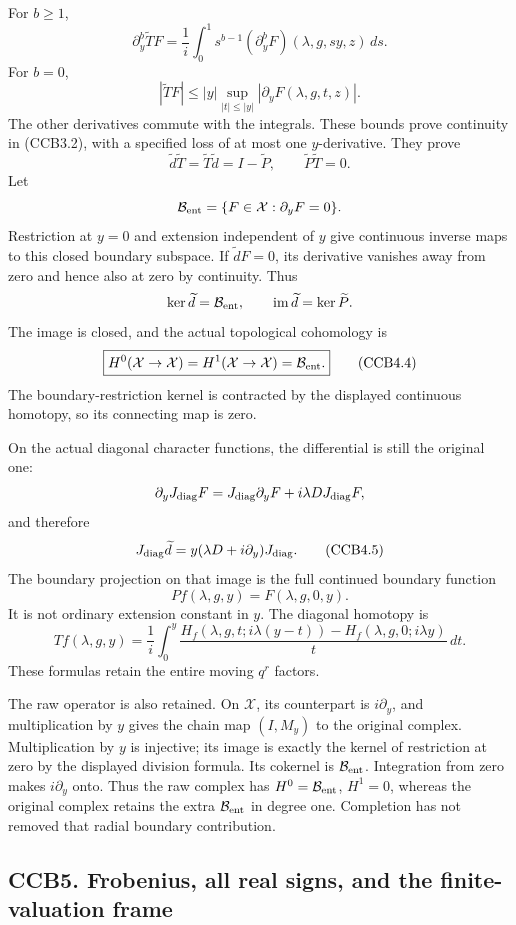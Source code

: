 For \(b\ge1\), \[
\partial_y^b\widetilde TF
=\frac1i\int_0^1s^{b-1}
(\partial_y^bF)(\lambda,g,sy,z)\,ds.
\tag{CCB4.2}
\] For \(b=0\), \[
|\widetilde TF|\le |y|
\sup_{|t|\le|y|}|\partial_yF(\lambda,g,t,z)|.
\] The other derivatives commute with the integrals. These bounds prove
continuity in (CCB3.2), with a specified loss of at most one
\(y\)-derivative. They prove \[
\widetilde d\widetilde T
=\widetilde T\widetilde d=I-\widetilde P,\qquad
\widetilde P\widetilde T=0.
\tag{CCB4.3}
\] Let \[
\mathcal B_{\rm ent}=\{F\in\mathcal X:\partial_yF=0\}.
\] Restriction at \(y=0\) and extension independent of \(y\) give
continuous inverse maps to this closed boundary subspace. If
\(\widetilde dF=0\), its derivative vanishes away from zero and hence
also at zero by continuity. Thus \[
\ker\widetilde d=\mathcal B_{\rm ent},\qquad
\operatorname{im}\widetilde d=\ker\widetilde P.
\] The image is closed, and the actual topological cohomology is \[
\boxed{H^0(\mathcal X\to\mathcal X)=
H^1(\mathcal X\to\mathcal X)=\mathcal B_{\rm ent}.}
\tag{CCB4.4}
\] The boundary-restriction kernel is contracted by the displayed
continuous homotopy, so its connecting map is zero.

On the actual diagonal character functions, the differential is still
the original one: \[
\partial_yJ_{\rm diag}F
=J_{\rm diag}\partial_yF+i\lambda D J_{\rm diag}F,
\] and therefore \[
J_{\rm diag}\widetilde d
=y(\lambda D+i\partial_y)J_{\rm diag}.
\tag{CCB4.5}
\] The boundary projection on that image is the full continued boundary
function \[
P f(\lambda,g,y)=F(\lambda,g,0,y).
\] It is not ordinary extension constant in \(y\). The diagonal homotopy
is \[
Tf(\lambda,g,y)=\frac1i\int_0^y
\frac{
H_f(\lambda,g,t;i\lambda(y-t))-
H_f(\lambda,g,0;i\lambda y)}
t\,dt.
\tag{CCB4.6}
\] These formulas retain the entire moving \(q^r\) factors.

The raw operator is also retained. On \(\mathcal X\), its counterpart is
\(i\partial_y\), and multiplication by \(y\) gives the chain map
\((I,M_y)\) to the original complex. Multiplication by \(y\) is
injective; its image is exactly the kernel of restriction at zero by the
displayed division formula. Its cokernel is \(\mathcal B_{\rm ent}\).
Integration from zero makes \(i\partial_y\) onto. Thus the raw complex
has \(H^0=\mathcal B_{\rm ent}\), \(H^1=0\), whereas the original
complex retains the extra \(\mathcal B_{\rm ent}\) in degree one.
Completion has not removed that radial boundary contribution.

\subsection{CCB5. Frobenius, all real signs, and the finite-valuation
frame}\label{ccb5.-frobenius-all-real-signs-and-the-finite-valuation-frame}

